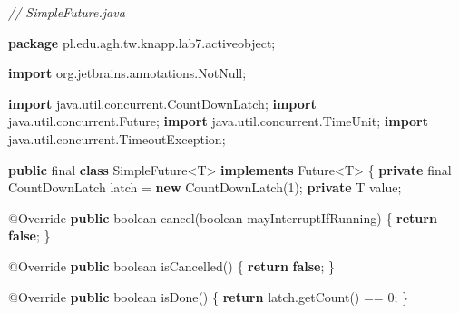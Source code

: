 \documentclass[11pt]{article}
\newenvironment{Shaded}{}{}
\newcommand{\KeywordTok}[1]{\textcolor[rgb]{0.00,0.44,0.13}{\textbf{{#1}}}}
\newcommand{\DataTypeTok}[1]{\textcolor[rgb]{0.56,0.13,0.00}{{#1}}}
\newcommand{\DecValTok}[1]{\textcolor[rgb]{0.25,0.63,0.44}{{#1}}}
\newcommand{\CommentTok}[1]{\textcolor[rgb]{0.38,0.63,0.69}{\textit{{#1}}}}
\newcommand{\FunctionTok}[1]{\textcolor[rgb]{0.02,0.16,0.49}{{#1}}}
\newcommand{\NormalTok}[1]{{#1}}
\newcommand{\ImportTok}[1]{{#1}}
\newcommand{\ControlFlowTok}[1]{\textcolor[rgb]{0.00,0.44,0.13}{\textbf{{#1}}}}
\newcommand{\OperatorTok}[1]{\textcolor[rgb]{0.40,0.40,0.40}{{#1}}}
\newcommand{\BuiltInTok}[1]{{#1}}
\newcommand{\AttributeTok}[1]{\textcolor[rgb]{0.49,0.56,0.16}{{#1}}}
\begin{document}
\begin{Shaded}
\begin{Highlighting}[]
\CommentTok{// SimpleFuture.java}

\KeywordTok{package}\ImportTok{ pl}\OperatorTok{.}\ImportTok{edu}\OperatorTok{.}\ImportTok{agh}\OperatorTok{.}\ImportTok{tw}\OperatorTok{.}\ImportTok{knapp}\OperatorTok{.}\ImportTok{lab7}\OperatorTok{.}\ImportTok{activeobject}\OperatorTok{;}

\KeywordTok{import} \ImportTok{org}\OperatorTok{.}\ImportTok{jetbrains}\OperatorTok{.}\ImportTok{annotations}\OperatorTok{.}\ImportTok{NotNull}\OperatorTok{;}

\KeywordTok{import} \ImportTok{java}\OperatorTok{.}\ImportTok{util}\OperatorTok{.}\ImportTok{concurrent}\OperatorTok{.}\ImportTok{CountDownLatch}\OperatorTok{;}
\KeywordTok{import} \ImportTok{java}\OperatorTok{.}\ImportTok{util}\OperatorTok{.}\ImportTok{concurrent}\OperatorTok{.}\ImportTok{Future}\OperatorTok{;}
\KeywordTok{import} \ImportTok{java}\OperatorTok{.}\ImportTok{util}\OperatorTok{.}\ImportTok{concurrent}\OperatorTok{.}\ImportTok{TimeUnit}\OperatorTok{;}
\KeywordTok{import} \ImportTok{java}\OperatorTok{.}\ImportTok{util}\OperatorTok{.}\ImportTok{concurrent}\OperatorTok{.}\ImportTok{TimeoutException}\OperatorTok{;}

\KeywordTok{public} \DataTypeTok{final} \KeywordTok{class}\NormalTok{ SimpleFuture}\OperatorTok{\textless{}}\NormalTok{T}\OperatorTok{\textgreater{}} \KeywordTok{implements} \BuiltInTok{Future}\OperatorTok{\textless{}}\NormalTok{T}\OperatorTok{\textgreater{}} \OperatorTok{\{}
    \KeywordTok{private} \DataTypeTok{final} \BuiltInTok{CountDownLatch}\NormalTok{ latch }\OperatorTok{=} \KeywordTok{new} \BuiltInTok{CountDownLatch}\OperatorTok{(}\DecValTok{1}\OperatorTok{);}
    \KeywordTok{private}\NormalTok{ T value}\OperatorTok{;}

    \AttributeTok{@Override}
    \KeywordTok{public} \DataTypeTok{boolean} \FunctionTok{cancel}\OperatorTok{(}\DataTypeTok{boolean}\NormalTok{ mayInterruptIfRunning}\OperatorTok{)} \OperatorTok{\{}
        \ControlFlowTok{return} \KeywordTok{false}\OperatorTok{;}
    \OperatorTok{\}}

    \AttributeTok{@Override}
    \KeywordTok{public} \DataTypeTok{boolean} \FunctionTok{isCancelled}\OperatorTok{()} \OperatorTok{\{}
        \ControlFlowTok{return} \KeywordTok{false}\OperatorTok{;}
    \OperatorTok{\}}

    \AttributeTok{@Override}
    \KeywordTok{public} \DataTypeTok{boolean} \FunctionTok{isDone}\OperatorTok{()} \OperatorTok{\{}
        \ControlFlowTok{return}\NormalTok{ latch}\OperatorTok{.}\FunctionTok{getCount}\OperatorTok{()} \OperatorTok{==} \DecValTok{0}\OperatorTok{;}
    \OperatorTok{\}}


\end{Highlighting}
\end{Shaded}
\end{document}
